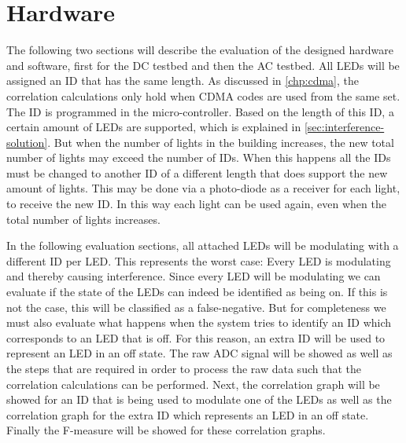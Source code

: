 
\section{Hardware}
\label{sec:hardware-evaluation}

The following two sections will describe the evaluation of the designed hardware and software, first for the DC testbed and then the AC testbed.
All LEDs will be assigned an ID that has the same length.
As discussed in \autoref{chp:cdma}, the correlation calculations only hold when CDMA codes are used from the same set.
The ID is programmed in the micro-controller. %
Based on the length of this ID, a certain amount of LEDs are supported, which is explained in \autoref{sec:interference-solution}.
But when the number of lights in the building increases, the new total number of lights may exceed the number of IDs.
When this happens all the IDs must be changed to another ID of a different length that does support the new amount of lights.
This may be done via a photo-diode as a receiver for each light, to receive the new ID.
In this way each light can be used again, even when the total number of lights increases.


In the following evaluation sections, all attached LEDs will be modulating with a different ID per LED.
This represents the worst case: Every LED is modulating and thereby causing interference.
Since every LED will be modulating we can evaluate if the state of the LEDs can indeed be identified as being on.
If this is not the case, this will be classified as a false-negative.
But for completeness we must also evaluate what happens when the system tries to identify an ID which corresponds to an LED that is off.
For this reason, an extra ID will be used to represent an LED in an off state.
The raw ADC signal will be showed as well as the steps that are required in order to process the raw data such that the correlation calculations can be performed.
Next, the correlation graph will be showed for an ID that is being used to modulate one of the LEDs as well as the correlation graph for the extra ID which represents an LED in an off state. 
Finally the F-measure will be showed for these correlation graphs.











